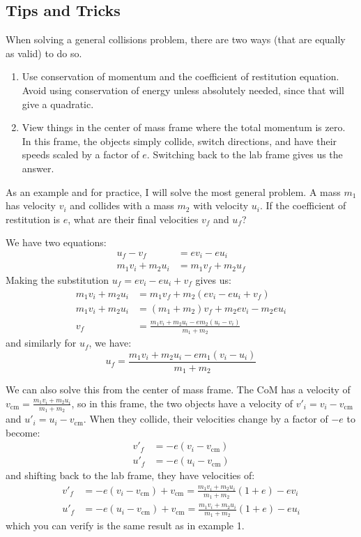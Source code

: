 \documentclass{article}
\begin{document}
\subsection{Tips and Tricks}
When solving a general collisions problem, there are two ways (that are equally as valid) to do so.
\begin{enumerate}
    \item Use conservation of momentum and the coefficient of restitution equation. Avoid using conservation of energy unless absolutely needed, since that will give a quadratic.
    \item View things in the center of mass frame where the total momentum is zero. In this frame, the objects simply collide, switch directions, and have their speeds scaled by a factor of $e$. Switching back to the lab frame gives us the answer.
\end{enumerate}
\begin{example}
    As an example and for practice, I will solve the most general problem. A mass $m_1$ has velocity $v_i$ and collides with a mass $m_2$ with velocity $u_i$. If the coefficient of restitution is $e$, what are their final velocities $v_f$ and $u_f$?
    \vspace{2mm}

    We have two equations:
    \begin{align}
        u_f-v_f&=ev_i-eu_i \\
        m_1v_i+m_2u_i &= m_1v_f+m_2u_f
    \end{align}
    Making the substitution $u_f=ev_i-eu_i+v_f$ gives us:
    \begin{align}
        m_1v_i+m_2u_i &= m_1v_f+m_2(ev_i-eu_i+v_f) \\
        m_1v_i+m_2u_i &= (m_1+m_2)v_f+m_2ev_i-m_2eu_i \\ 
        v_f &= \frac{m_1v_i+m_2u_i-em_2(u_i-v_i)}{m_1+m_2}
    \end{align}
    and similarly for $u_f$, we have:
    \begin{equation}
        u_f = \frac{m_1v_i+m_2u_i-em_1(v_i-u_i)}{m_1+m_2}
    \end{equation}
\end{example}
\begin{example}
\vspace{2mm}
We can also solve this from the center of mass frame. The CoM has a velocity of $v_\text{cm}=\frac{m_1v_i+m_2u_i}{m_1+m_2}$, so in this frame, the two objects have a velocity of $v'_i=v_i-v_\text{cm}$ and $u'_i=u_i-v_\text{cm}$. When they collide, their velocities change by a factor of $-e$ to become:
\begin{align}
    v'_f &= -e(v_i-v_\text{cm}) \\
    u'_f &= -e(u_i-v_\text{cm}) 
\end{align}
and shifting back to the lab frame, they have velocities of:
\begin{align}
    v'_f &= -e(v_i-v_\text{cm})+v_\text{cm}=\frac{m_1v_i+m_2u_i}{m_1+m_2}(1+e)-ev_i \\
    u'_f &= -e(u_i-v_\text{cm})+v_\text{cm}=\frac{m_1v_i+m_2u_i}{m_1+m_2}(1+e)-eu_i
\end{align}
which you can verify is the same result as in example 1.
\end{example}
\end{document}
